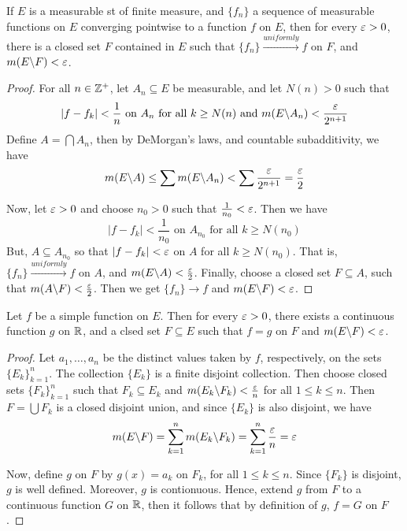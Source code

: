\begin{theorem}\label{3.3.2}
    If $E$ is a measurable st of finite measure, and  $\{f_n\}$ a sequence of
    measurable functions on $E$ converging pointwise to a function  $f$ on  $E$,
    then for every $\varepsilon>0$, there is a closed set $F$ contained in  $E$ such that
     $\{f_n\} \xrightarrow{uniformly} f$ on $F$, and  $m(E\backslash F)<\varepsilon$.
\end{theorem}
\begin{proof}
    For all $n \in \mathbb{Z}^+$, let  $A_n \subseteq E$ be measurable, and let
    $N(n)>0$ such that
    \begin{equation*}
        |f-f_k|<\frac{1}{n} \text{ on } A_n \text{ for all } k \geq N(n)
        \text{ and } m(E\backslash A_n)<\frac{\varepsilon}{2^{n+1}}
    \end{equation*}
    Define $A=\bigcap{A_n}$, then by DeMorgan's laws, and countable
    subadditivity, we have
    \begin{equation*}
        m(E\backslash A) \leq
        \sum{m(E\backslash A_n)}<\sum{\frac{\varepsilon}{2^{n+1}}}=\frac{\varepsilon}{2}
    \end{equation*}

    Now, let $\varepsilon>0$ and choose  $n_0>0$ such that $\frac{1}{n_0}<\varepsilon$. Then we
    have
    \begin{equation*}
        |f-f_k|<\frac{1}{n_0} \text{ on } A_{n_0} \text{ for all } k \geq N(n_0)
    \end{equation*}
    But, $A \subseteq A_{n_0}$ so that $|f-f_k|<\varepsilon$ on  $A$ for all  $k \geq
    N(n_0)$. That is, $\{f_n\} \xrightarrow{uniformly} f$ on $A$, and
    $m(E\backslash A)<\frac{\varepsilon}{2}$. Finally, choose a closed set $F \subseteq A$,
    such that  $m(A\backslash F)<\frac{\varepsilon}{2}$. Then we get $\{f_n\} \xrightarrow{}
    f$ and $m(E\backslash F)<\varepsilon$.
\end{proof}

\begin{lemma}[Littlewood]\label{3.3.3}
    Let $f$ be a simple function on  $E$. Then for every  $\varepsilon>0$, there exists a
    continuous function  $g$ on  $\mathbb{R}$, and a clsed set  $F \subseteq E$ such
    that  $f=g$ on  $F$ and  $m(E\backslash F)<\varepsilon$.
\end{lemma}
\begin{proof}
    Let $a_1, \dots, a_n$ be the distinct values taken by $f$, respectively, on
    the sets  $\{E_k\}_{k=1}^n$. The collection $\{E_k\}$ is a finite disjoint
    collection. Then choose closed sets $\{F_k\}_{k=1}^n$ such that $F_k
    \subseteq E_k$ and $m(E_k\backslash F_k)<\frac{\varepsilon}{n}$ for all  $1 \leq k \leq
    n$. Then $F=\bigcup{F_k}$ is a closed disjoint union, and since $\{E_k\}$ is
    also disjoint, we have
    \begin{equation*}
        m(E\backslash F)=\sum_{k=1}^n{m(E_k\backslash F_k)}=\sum_{k=1}^n{\frac{\varepsilon}{n}}=\varepsilon
    \end{equation*}

    Now, define $g$ on  $F$ by  $g(x)=a_k$ on $F_k$, for all  $1 \leq k \leq n$.
    Since  $\{F_k\}$ is disjoint, $g$ is well defined. Moreover,  $g$ is
    contionuous. Hence, extend  $g$ from  $F$ to a continuous function  $G$ on
    $\mathbb{R}$, then it follows that by definition of  $g$,  $f=G$ on  $F$.
\end{proof}

